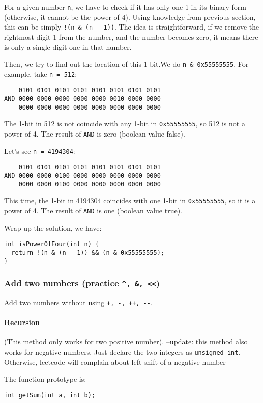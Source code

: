 \documentclass[12pt]{article}
\begin{document}
For a given number \texttt{n}, we have to check if it has only one 1 in its binary form (otherwise, it cannot be the power of 4). Using knowledge from previous section, this can be simply \texttt{!(n \& (n - 1))}. The idea is straightforward, if we remove the rightmost digit 1 from the number, and the number becomes zero, it means there is only a single digit one in that number.

Then, we try to find out the location of this 1-bit.We do \texttt{n \& 0x55555555}. For example, take \texttt{n = 512}:
\begin{verbatim}
    0101 0101 0101 0101 0101 0101 0101 0101
AND 0000 0000 0000 0000 0000 0010 0000 0000
    0000 0000 0000 0000 0000 0000 0000 0000
\end{verbatim}
The 1-bit in 512 is not coincide with any 1-bit in \texttt{0x55555555}, so 512 is not a power of 4. The result of \texttt{AND} is zero (boolean value false).

Let's see \texttt{n = 4194304}:
\begin{verbatim}
    0101 0101 0101 0101 0101 0101 0101 0101
AND 0000 0000 0100 0000 0000 0000 0000 0000
    0000 0000 0100 0000 0000 0000 0000 0000
\end{verbatim}
This time, the 1-bit in 4194304 coincides with one 1-bit in \texttt{0x55555555}, so it is a power of 4. The result of \texttt{AND} is one (boolean value true).

Wrap up the solution, we have:
\begin{verbatim}
int isPowerOfFour(int n) {
  return !(n & (n - 1)) && (n & 0x55555555);
}
\end{verbatim}
\subsubsection{Add two numbers (practice \texttt{\textasciicircum{}, \&, <<})}
\label{sec:org9f7e76d}
Add two numbers without using \texttt{+, -, ++, -{}-}.
\paragraph{Recursion}
\label{sec:org1443688}
(This method only works for two positive number).
--update: this method also works for negative numbers. Just declare the two integers as \texttt{unsigned int}. Otherwise, leetcode will complain about left shift of a negative number

The function prototype is:
\begin{verbatim}
int getSum(int a, int b);
\end{verbatim}
\end{document}
